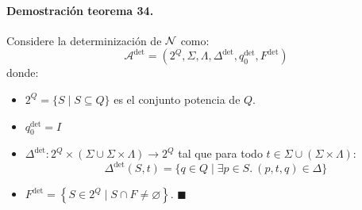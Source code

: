 \paragraph{Demostración teorema 34.} Considere la determinización de $\mathcal{N}$ como:
$$
\mathcal{A}^{\text{det}}=\left(2^Q, \Sigma, \Lambda, \Delta^{\text{det}}, q_0^{\text{det}}, F^{\text{det}}\right)
$$
donde:
\begin{itemize}
    \item $2^Q=\{S \mid S \subseteq Q\}$ es el conjunto potencia de $Q$.
    \item $q_0^{\text{det}}=I$
    \item $\Delta^{\operatorname{det}}: 2^Q \times(\Sigma \cup \Sigma \times \Lambda) \rightarrow 2^Q$ tal que para todo $t \in \Sigma \cup(\Sigma \times \Lambda)$:
    $$
    \Delta^{\text{det}}(S, t)=\{q \in Q \mid \exists p \in S.\ (p, t, q) \in \Delta\}
    $$
    \item $F^{\text{det}}=\left\{S \in 2^Q \mid S \cap F \neq \varnothing\right\}$. \hfill $\blacksquare$
\end{itemize}









